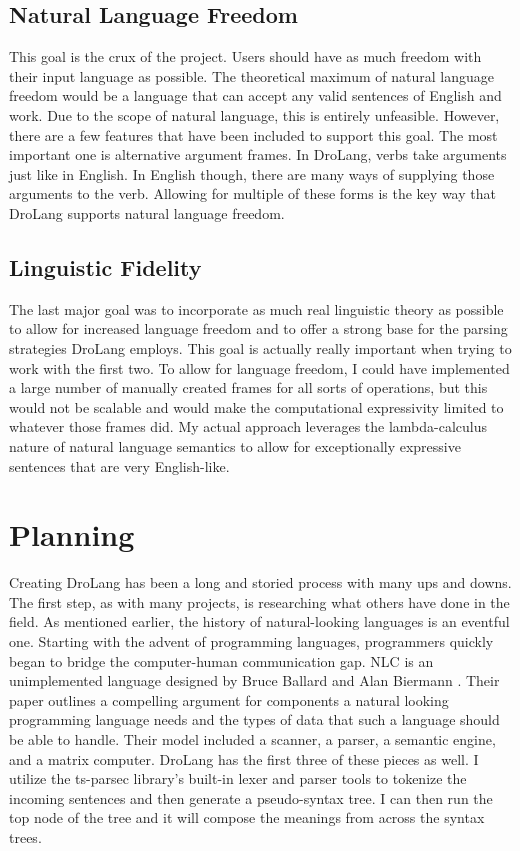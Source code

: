 \documentclass[titlepage]{article}
\newcommand{\langName}{DroLang}
\begin{document}
\subsection*{Natural Language Freedom}
This goal is the crux of the project. Users should have as much freedom with their input language as possible. The theoretical maximum of natural language freedom would be a language that can accept any valid sentences of English and work. Due to the scope of natural language, this is entirely unfeasible. However, there are a few features that have been included to support this goal. The most important one is alternative argument frames. In \langName{}, verbs take arguments just like in English. In English though, there are many ways of supplying those arguments to the verb. Allowing for multiple of these forms is the key way that \langName{} supports natural language freedom.

\subsection*{Linguistic Fidelity}
The last major goal was to incorporate as much real linguistic theory as possible to allow for increased language freedom and to offer a strong base for the parsing strategies \langName{} employs. This goal is actually really important when trying to work with the first two. To allow for language freedom, I could have implemented a large number of manually created frames for all sorts of operations, but this would not be scalable and would make the computational expressivity limited to whatever those frames did. My actual approach leverages the lambda-calculus nature of natural language semantics to allow for exceptionally expressive sentences that are very English-like.

\section*{Planning}
Creating \langName{} has been a long and storied process with many ups and downs. The first step, as with many projects, is researching what others have done in the field. As mentioned earlier, the history of natural-looking languages is an eventful one. Starting with the advent of programming languages, programmers quickly began to bridge the computer-human communication gap. NLC is an unimplemented language designed by Bruce Ballard and Alan Biermann \cite{Ballard1979ProgrammingIN}. Their paper outlines a compelling argument for components a natural looking programming language needs and the types of data that such a language should be able to handle. Their model included a scanner, a parser, a semantic engine, and a matrix computer. \langName{} has the first three of these pieces as well. I utilize the ts-parsec library's built-in lexer and parser tools to tokenize the incoming sentences and then generate a pseudo-syntax tree. I can then run the top node of the tree and it will compose the meanings from across the syntax trees.
\end{document}
